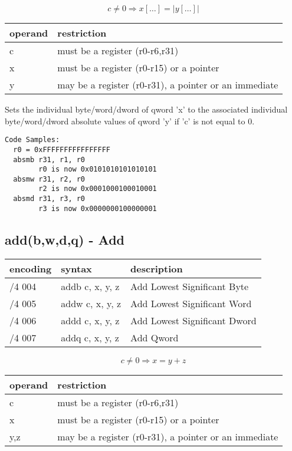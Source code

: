 \documentclass[letterpaper,10pt,openright,twoside,onecolumn]{book}
\begin{document}
  \begin{displaymath} c \neq 0 \Rightarrow x[\ldots] = |y[\ldots]|\end{displaymath}

  \flushleft
  \begin{tabular}{|l|l|}
   \hline
    operand & restriction \\
   \hline
    c & must be a register (r0-r6,r31) \\
    x & must be a register (r0-r15) or a pointer \\
    y & may be a register (r0-r31), a pointer or an immediate \\
   \hline
  \end{tabular}

  Sets the individual byte/word/dword of qword 'x' to the associated
  individual byte/word/dword absolute values of qword 'y' if 'c' is
  not equal to 0.

  \begin{verbatim}
Code Samples:
  r0 = 0xFFFFFFFFFFFFFFFF
  absmb r31, r1, r0
        r0 is now 0x0101010101010101
  absmw r31, r2, r0
        r2 is now 0x0001000100010001
  absmd r31, r3, r0
        r3 is now 0x0000000100000001
  \end{verbatim}

\newpage\subsection{add(b,w,d,q) - Add}
  \begin{tabular}{|l|l|l|}
   \hline
    encoding & syntax & description \\
   \hline
    /4 004 & addb c, x, y, z & Add Lowest Significant Byte \\
    /4 005 & addw c, x, y, z & Add Lowest Significant Word \\
    /4 006 & addd c, x, y, z & Add Lowest Significant Dword \\
    /4 007 & addq c, x, y, z & Add Qword \\
   \hline
  \end{tabular}

  \begin{displaymath} c \neq 0 \Rightarrow x = y + z\end{displaymath}

  \flushleft
  \begin{tabular}{|l|l|}
   \hline
    operand & restriction \\
   \hline
    c & must be a register (r0-r6,r31) \\
    x & must be a register (r0-r15) or a pointer \\
    y,z & may be a register (r0-r31), a pointer or an immediate \\
   \hline
  \end{tabular}
\end{document}
